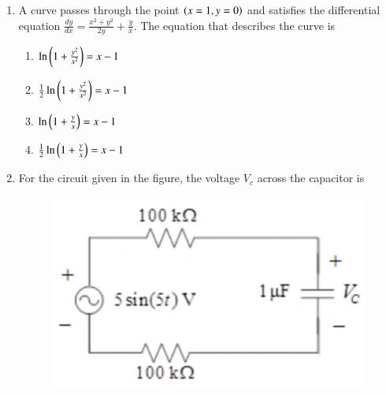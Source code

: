 \documentclass[a4paper, 11pt]{article}
\begin{document}
\begin{enumerate}
    \hfill{}

    \item A curve passes through the point $\left(x=1, y=0\right)$ and satisfies the differential equation $\frac{dy}{dx} = \frac{x^2+y^2}{2y} + \frac{y}{x}$. The equation that describes the curve is
    \begin{enumerate}
        \item $\ln\left(1+\frac{y^2}{x^2}\right) = x-1$
        \item $\frac{1}{2}\ln\left(1+\frac{y^2}{x^2}\right) = x-1$
        \item $\ln\left(1+\frac{y}{x}\right) = x-1$
        \item $\frac{1}{2}\ln\left(1+\frac{y}{x}\right) = x-1$
    \end{enumerate}

    \hfill{}

    \item For the circuit given in the figure, the voltage $V_c$  across the capacitor is
    \begin{figure}[H]
        \centering
        \includegraphics[width=0.6\columnwidth]{figs/q35.png}
        \caption*{}
        \label{fig:q35}
    \end{figure}
    \begin{enumerate}
    \end{enumerate}

    \hfill{}


\end{enumerate}
\end{document}
